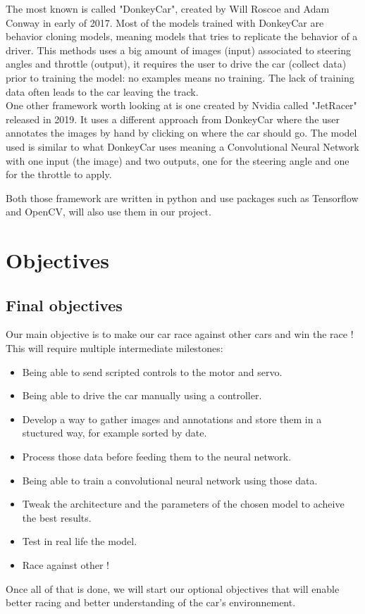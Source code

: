 \documentclass[12pt]{article}
\begin{document}
The most known is called "DonkeyCar", created by Will Roscoe and Adam Conway in early of 2017. Most of the models trained with DonkeyCar are behavior cloning models, meaning models that tries to replicate the behavior of a driver. This methods uses a big amount of images (input) associated to steering angles and throttle (output), it requires the user to drive the car (collect data) prior to training the model: no examples means no training. The lack of training data often leads to the car leaving the track.\\

One other framework worth looking at is one created by Nvidia called "JetRacer" released in 2019. It uses a different approach from DonkeyCar where the user annotates the images by hand by clicking on where the car should go. The model used is similar to what DonkeyCar uses meaning a Convolutional Neural Network with one input (the image) and two outputs, one for the steering angle and one for the throttle to apply.

Both those framework are written in python and use packages such as Tensorflow and OpenCV, will also use them in our project.

\section{Objectives}

\subsection{Final objectives}
Our main objective is to make our car race against other cars and win the race !
This will require multiple intermediate milestones:
\begin{itemize}
\item Being able to send scripted controls to the motor and servo.
\item Being able to drive the car manually using a controller.
\item Develop a way to gather images and annotations and store them in a stuctured way, for example sorted by date.
\item Process those data before feeding them to the neural network.
\item Being able to train a convolutional neural network using those data.
\item Tweak the architecture and the parameters of the chosen model to acheive the best results.
\item Test in real life the model.
\item Race against other !
\end{itemize}
Once all of that is done, we will start our optional objectives that will enable better racing and better understanding of the car's environnement.
\end{document}
